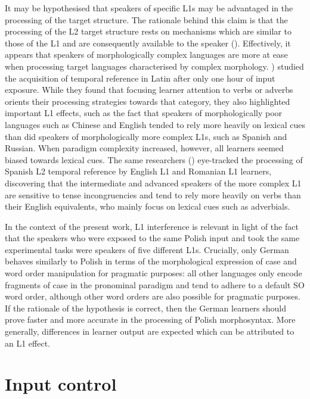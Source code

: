 It may be hypothesised that speakers of specific L1s may be advantaged in the processing of the target structure. The rationale behind this claim is that the processing of the L2 target structure rests on mechanisms which are similar to those of the L1 and are consequently available to the speaker (\citealt{TokowiczMacWhinney2005, Ellis2006a}). Effectively, it appears that speakers of morphologically complex languages are more at ease when processing target languages characterised by complex morphology. \citet{EllisSagarra2010a,EllisSagarra2010b,EllisSagarra2011}) studied the acquisition of temporal reference in Latin after only one hour of input exposure. While they found that focusing learner attention to verbs or adverbs orients their processing strategies towards that category, they also highlighted important L1 effects, such as the fact that speakers of morphologically poor languages such as Chinese and English tended to rely more heavily on lexical cues than did speakers of morphologically more complex L1s, such as Spanish and Russian. When paradigm complexity increased, however, all learners seemed biased towards lexical cues. The same researchers (\citealt{SagarraEllis2013, Sagarra2014}) eye-tracked the processing of Spanish L2 temporal reference by English L1 and Romanian L1 learners, discovering that the intermediate and advanced speakers of the more complex L1 are sensitive to tense incongruencies and tend to rely more heavily on verbs than their English equivalents, who mainly focus on lexical cues such as adverbials.

In the context of the present work, L1 interference is relevant in light of the fact that the speakers who were exposed to the same Polish input and took the same experimental tasks were speakers of five different L1s. Crucially, only German behaves similarly to Polish in terms of the morphological expression of case and word order manipulation for pragmatic purposes: all other languages only encode fragments of case in the pronominal paradigm and tend to adhere to a default SO word order, although other word orders are also possible for pragmatic purposes. If the rationale of the hypothesis is correct, then the German learners should prove faster and more accurate in the processing of Polish morphosyntax. More generally, differences in learner output are expected which can be attributed to an L1 effect.

\section{Input control}\label{sec:01:4}

